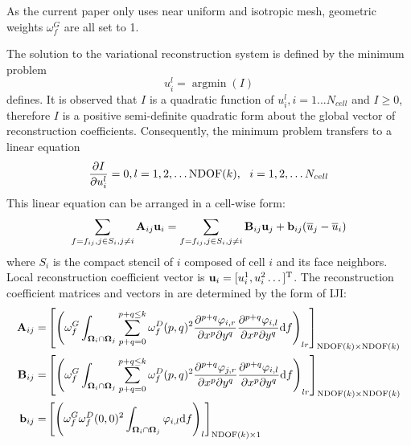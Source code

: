 As the current paper only uses near uniform and isotropic mesh,
geometric weights
$\omega^G_f$ are all set to 1.

The solution to the variational reconstruction system is defined by the minimum problem
\begin{equation}
    u_i^l = \mathop{\arg \min}(I)
\end{equation}
defines.
It is observed that $I$ is a quadratic function of $u_i^l, i = 1...N_{cell}$ and
$I\geq 0$,
therefore $I$ is a positive semi-definite quadratic form about the global vector of reconstruction
coefficients. Consequently, the minimum problem transfers to a linear equation
\begin{equation}
    \partialderivative{I}{u_i^l} = 0, l=1,2,\dots \mathrm{NDOF}(k),\ \ i=1,2,\dots N_{cell}
\end{equation}
This linear equation can be arranged in a cell-wise form:
\begin{equation}
    \label{eq:vrBlockEq}
    \sum_{f=f_{ij},j\in S_i, j\neq i}{ \mathbf{A}_{ij} \mathbf{u}_i}
    =
    \sum_{f=f_{ij},j\in S_i, j\neq i}{ \mathbf{B}_{ij} \mathbf{u}_j + \mathbf{b}_{ij} (\overline{u}_j - \overline{u}_i)}
\end{equation}
where $S_i$ is the compact stencil of $i$ composed of cell $i$ and its face neighbors.
Local reconstruction coefficient vector is $\mathbf{u}_i = [u_i^1,u_i^2\dots]^\mathrm{T}$.
The reconstruction coefficient matrices and vectors in 
are determined by the form of IJI:
\begin{equation}
    \label{eq:vrCoeffs}
    \begin{aligned}
        \mathbf{A}_{ij} = &
        \left[
            \left({
                \omega_f^G\int_{\OO_i \cap \OO_j}{
                    \sum_{p+q=0}^{p + q\leq k}
                    \omega_f^D(p,q)^2
                    \partialderivative{^{p+q}\varphi_{i,r}}{x^p\partial y^q}
                    \partialderivative{^{p+q}\varphi_{i,l}}{x^p\partial y^q}
                    \dd f}
            }\right)_{lr}
        \right]_{\mathrm{NDOF}(k) \times \mathrm{NDOF}(k)} \\
        \mathbf{B}_{ij}=  &
        \left[
            \left({
                \omega_f^G\int_{\OO_i \cap \OO_j}{
                    \sum_{p+q=0}^{p + q\leq k}
                    \omega_f^D(p,q)^2
                    \partialderivative{^{p+q}\varphi_{j,r}}{x^p\partial y^q}
                    \partialderivative{^{p+q}\varphi_{i,l}}{x^p\partial y^q}
                    \dd f}
            }\right)_{lr}
        \right]_{\mathrm{NDOF}(k) \times \mathrm{NDOF}(k)} \\
        \mathbf{b}_{ij}=  &
        \left[
            \left({
                    \omega_f^G\omega_f^D(0,0)^2
                    \int_{\OO_i \cap \OO_j}{
                        \varphi_{i,l}
                        \dd f}
                }\right)_{l}
        \right]_{\mathrm{NDOF}(k) \times 1}                \\
    \end{aligned}
\end{equation}

